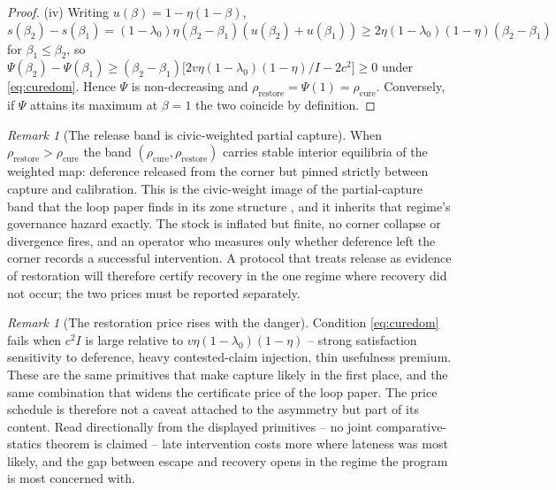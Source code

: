 \documentclass[11pt]{article}
\theoremstyle{definition}
\theoremstyle{remark}
\newtheorem{remark}[theorem]{Remark}
\numberwithin{equation}{section}
\begin{document}
\begin{proof}
(iv) Writing $u(\beta) = 1-\eta(1-\beta)$, $s(\beta_2)-s(\beta_1) = (1-\lambda_0)\eta(\beta_2-\beta_1)(u(\beta_2)+u(\beta_1)) \ge 2\eta(1-\lambda_0)(1-\eta)(\beta_2-\beta_1)$ for $\beta_1 \le \beta_2$, so $\Psi(\beta_2) - \Psi(\beta_1) \ge (\beta_2-\beta_1)\bigl[2v\eta(1-\lambda_0)(1-\eta)/I - 2c^2\bigr] \ge 0$ under \eqref{eq:curedom}. Hence $\Psi$ is non-decreasing and $\rho_{\mathrm{restore}} = \Psi(1) = \rho_{\mathrm{cure}}$. Conversely, if $\Psi$ attains its maximum at $\beta = 1$ the two coincide by definition.
\end{proof}

\begin{remark}[The release band is civic-weighted partial capture]\label{rem:band}
When $\rho_{\mathrm{restore}} > \rho_{\mathrm{cure}}$ the band $(\rho_{\mathrm{cure}}, \rho_{\mathrm{restore}})$ carries stable interior equilibria of the weighted map: deference released from the corner but pinned strictly between capture and calibration. This is the civic-weight image of the partial-capture band that the loop paper finds in its zone structure \citep{hofheinz2026loops}, and it inherits that regime's governance hazard exactly. The stock is inflated but finite, no corner collapse or divergence fires, and an operator who measures only whether deference left the corner records a successful intervention. A protocol that treats release as evidence of restoration will therefore certify recovery in the one regime where recovery did not occur; the two prices must be reported separately.
\end{remark}

\begin{remark}[The restoration price rises with the danger]\label{rem:pricerise}
Condition \eqref{eq:curedom} fails when $c^2 I$ is large relative to $v\eta(1-\lambda_0)(1-\eta)$ -- strong satisfaction sensitivity to deference, heavy contested-claim injection, thin usefulness premium. These are the same primitives that make capture likely in the first place, and the same combination that widens the certificate price of the loop paper. The price schedule is therefore not a caveat attached to the asymmetry but part of its content. Read directionally from the displayed primitives -- no joint comparative-statics theorem is claimed -- late intervention costs more where lateness was most likely, and the gap between escape and recovery opens in the regime the program is most concerned with.
\end{remark}
\end{document}
